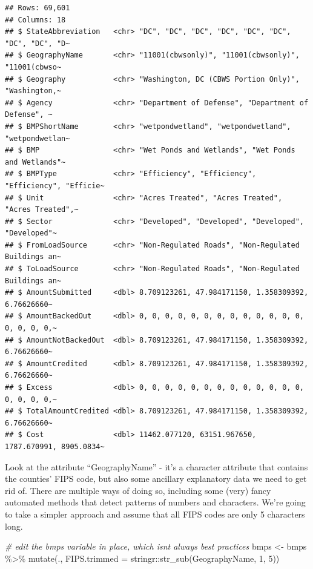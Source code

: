 \documentclass[]{article}
\newenvironment{Shaded}{\begin{snugshade}}{\end{snugshade}}
\newcommand{\AttributeTok}[1]{\textcolor[rgb]{0.77,0.63,0.00}{#1}}
\newcommand{\CommentTok}[1]{\textcolor[rgb]{0.56,0.35,0.01}{\textit{#1}}}
\newcommand{\DecValTok}[1]{\textcolor[rgb]{0.00,0.00,0.81}{#1}}
\newcommand{\FunctionTok}[1]{\textcolor[rgb]{0.00,0.00,0.00}{#1}}
\newcommand{\NormalTok}[1]{#1}
\newcommand{\OtherTok}[1]{\textcolor[rgb]{0.56,0.35,0.01}{#1}}
\newcommand{\SpecialCharTok}[1]{\textcolor[rgb]{0.00,0.00,0.00}{#1}}
\begin{document}
\begin{verbatim}
## Rows: 69,601
## Columns: 18
## $ StateAbbreviation   <chr> "DC", "DC", "DC", "DC", "DC", "DC", "DC", "DC", "D~
## $ GeographyName       <chr> "11001(cbwsonly)", "11001(cbwsonly)", "11001(cbwso~
## $ Geography           <chr> "Washington, DC (CBWS Portion Only)", "Washington,~
## $ Agency              <chr> "Department of Defense", "Department of Defense", ~
## $ BMPShortName        <chr> "wetpondwetland", "wetpondwetland", "wetpondwetlan~
## $ BMP                 <chr> "Wet Ponds and Wetlands", "Wet Ponds and Wetlands"~
## $ BMPType             <chr> "Efficiency", "Efficiency", "Efficiency", "Efficie~
## $ Unit                <chr> "Acres Treated", "Acres Treated", "Acres Treated",~
## $ Sector              <chr> "Developed", "Developed", "Developed", "Developed"~
## $ FromLoadSource      <chr> "Non-Regulated Roads", "Non-Regulated Buildings an~
## $ ToLoadSource        <chr> "Non-Regulated Roads", "Non-Regulated Buildings an~
## $ AmountSubmitted     <dbl> 8.709123261, 47.984171150, 1.358309392, 6.76626660~
## $ AmountBackedOut     <dbl> 0, 0, 0, 0, 0, 0, 0, 0, 0, 0, 0, 0, 0, 0, 0, 0, 0,~
## $ AmountNotBackedOut  <dbl> 8.709123261, 47.984171150, 1.358309392, 6.76626660~
## $ AmountCredited      <dbl> 8.709123261, 47.984171150, 1.358309392, 6.76626660~
## $ Excess              <dbl> 0, 0, 0, 0, 0, 0, 0, 0, 0, 0, 0, 0, 0, 0, 0, 0, 0,~
## $ TotalAmountCredited <dbl> 8.709123261, 47.984171150, 1.358309392, 6.76626660~
## $ Cost                <dbl> 11462.077120, 63151.967650, 1787.670991, 8905.0834~
\end{verbatim}

Look at the attribute ``GeographyName'' - it's a character attribute
that contains the counties' FIPS code, but also some ancillary
explanatory data we need to get rid of. There are multiple ways of doing
so, including some (very) fancy automated methods that detect patterns
of numbers and characters. We're going to take a simpler approach and
assume that all FIPS codes are only 5 characters long.

\begin{Shaded}
\begin{Highlighting}[]
\CommentTok{\# edit the bmps variable in place, which isn\textquotesingle{}t always best practices}
\NormalTok{bmps }\OtherTok{\textless{}{-}}\NormalTok{ bmps }\SpecialCharTok{\%\textgreater{}\%} \FunctionTok{mutate}\NormalTok{(., }\AttributeTok{FIPS.trimmed =}\NormalTok{ stringr}\SpecialCharTok{::}\FunctionTok{str\_sub}\NormalTok{(GeographyName, }\DecValTok{1}\NormalTok{, }\DecValTok{5}\NormalTok{))}
\end{Highlighting}
\end{Shaded}
\end{document}
